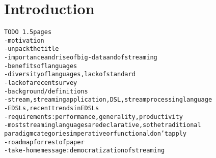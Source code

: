 \section{Introduction}\label{sec:introduction}

\begin{alltt}TODO\scriptsize ~1.5 pages
- motivation
  - unpack the title
  - importance and rise of big-data and of streaming
  - benefits of languages
  - diversity of languages, lack of standard
  - lack of a recent survey \cite{stephens_1997} \cite{johnston_hanna_millar_2004}
- background / definitions
  - stream, streaming application, DSL, stream processing language
  - EDSLs \cite{hudak_1998}, recent trends in EDSLs
  - requirements: performance, generality, productivity
  - most streaming languages are declarative, so the traditional
    paradigm categories imperative or functional don't apply
- roadmap for rest of paper
- take-home message: democratization of streaming
\end{alltt}
